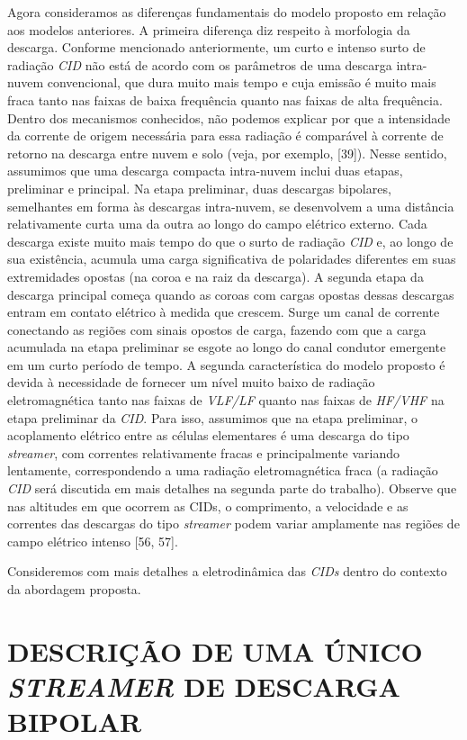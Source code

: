 \documentclass[a4paper, 12pt, onecolumn,singlespacing]{article}
\begin{document}
	Agora consideramos as diferenças fundamentais do modelo proposto em relação aos modelos anteriores. A primeira diferença diz respeito à morfologia da descarga. Conforme mencionado anteriormente, um curto e intenso surto de radiação \textit{CID} não está de acordo com os parâmetros de uma descarga intra-nuvem convencional, que dura muito mais tempo e cuja emissão é muito mais fraca tanto nas faixas de baixa frequência quanto nas faixas de alta frequência. Dentro dos mecanismos conhecidos, não podemos explicar por que a intensidade da corrente de origem necessária para essa radiação é comparável à corrente de retorno na descarga entre nuvem e solo (veja, por exemplo, [39]). Nesse sentido, assumimos que uma descarga compacta intra-nuvem inclui duas etapas, preliminar e principal. Na etapa preliminar, duas descargas bipolares, semelhantes em forma às descargas intra-nuvem, se desenvolvem a uma distância relativamente curta uma da outra ao longo do campo elétrico externo. Cada descarga existe muito mais tempo do que o surto de radiação \textit{CID} e, ao longo de sua existência, acumula uma carga significativa de polaridades diferentes em suas extremidades opostas (na coroa e na raiz da descarga). A segunda etapa da descarga principal começa quando as coroas com cargas opostas dessas descargas entram em contato elétrico à medida que crescem. Surge um canal de corrente conectando as regiões com sinais opostos de carga, fazendo com que a carga acumulada na etapa preliminar se esgote ao longo do canal condutor emergente em um curto período de tempo. A segunda característica do modelo proposto é devida à necessidade de fornecer um nível muito baixo de radiação eletromagnética tanto nas faixas de \textit{VLF/LF} quanto nas faixas de \textit{HF/VHF} na etapa preliminar da \textit{CID}. Para isso, assumimos que na etapa preliminar, o acoplamento elétrico entre as células elementares é uma descarga do tipo \textit{streamer}, com correntes relativamente fracas e principalmente variando lentamente, correspondendo a uma radiação eletromagnética fraca (a radiação \textit{CID} será discutida em mais detalhes na segunda parte do trabalho). Observe que nas altitudes em que ocorrem as CIDs, o comprimento, a velocidade e as correntes das descargas do tipo \textit{streamer} podem variar amplamente nas regiões de campo elétrico intenso [56, 57].
	
	Consideremos com mais detalhes a eletrodinâmica das \textit{CIDs} dentro do contexto da abordagem proposta.
	
	\section{DESCRIÇÃO DE UMA ÚNICO \textit{STREAMER} DE DESCARGA BIPOLAR}
	
\end{document}
